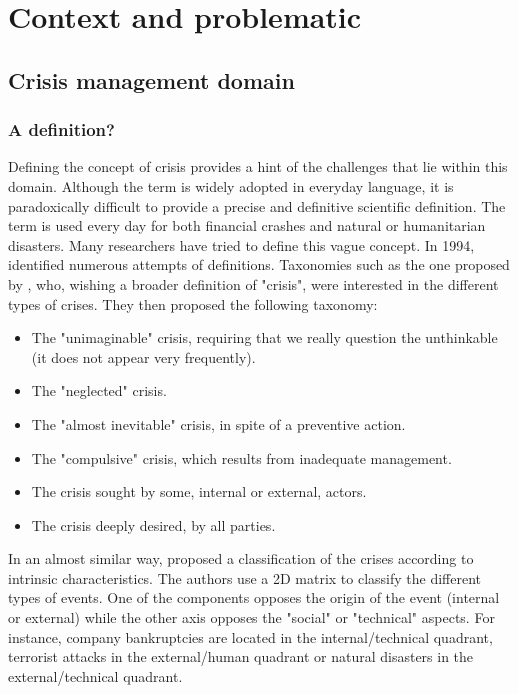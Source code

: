 \chapter{Context and problematic}

\section{Crisis management domain}
\subsection{A definition?}
Defining the concept of crisis provides a hint of the challenges that lie within this domain.
Although the term is widely adopted in everyday language, it is paradoxically difficult to provide a precise and definitive scientific definition.
The term is used every day for both financial crashes and natural or humanitarian disasters.
Many researchers have tried to define this vague concept.
In 1994, \cite{lagadecGESTIONCRISES1994} identified numerous attempts of definitions.
Taxonomies such as the one proposed by \cite{rosenthalCrisisDecisionMakingNetherlands1986}, who, wishing a broader definition of "crisis", were interested in the different types of crises.
They then proposed the following taxonomy:
\begin{itemize}
    \item The "unimaginable" crisis, requiring that we really question the unthinkable (it does not appear very frequently).
    \item The "neglected" crisis.
    \item The "almost inevitable" crisis, in spite of a preventive action.
    \item The "compulsive" crisis, which results from inadequate management.
    \item The crisis sought by some, internal or external, actors.
    \item The crisis deeply desired, by all parties.
\end{itemize}
In an almost similar way, \cite{mitroffStructureManmadeOrganizational1988} proposed a classification of the crises according to intrinsic characteristics.
The authors use a 2D matrix to classify the different types of events.
One of the components opposes the origin of the event (internal or external) while the other axis opposes the "social" or "technical" aspects.
For instance, company bankruptcies are located in the internal/technical quadrant, terrorist attacks in the external/human quadrant or natural disasters in the external/technical quadrant.
